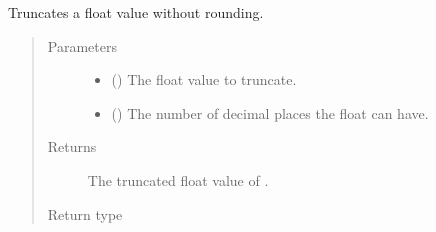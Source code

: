 \documentclass[letterpaper,10pt,english]{sphinxmanual}
\begin{document}
\begin{fulllineitems}
\label{\detokenize{app.utils:app.utils.convertions.truncate_float_value}}
Truncates a float value without rounding.
\begin{quote}\begin{description}
\item[{Parameters}] \leavevmode\begin{itemize}
\item {} 
 () \textendash{} The float value to truncate.

\item {} 
 () \textendash{} The number of decimal places the float can have.

\end{itemize}

\item[{Returns}] \leavevmode
The truncated float value of .

\item[{Return type}] \leavevmode
{}

\end{description}\end{quote}

\end{fulllineitems}

\end{document}
